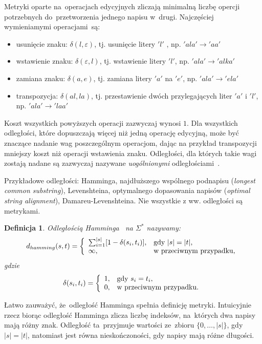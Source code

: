 \documentclass[12pt, twoside, openany]{report}
\theoremstyle{plain}
\newtheorem{defi}{Definicja}[section]
\begin{document}
Metryki oparte na~operacjach edycyjnych zliczają minimalną liczbę opercji potrzebnych do~przetworzenia jednego napisu w~drugi. Najczęściej wymieniamymi operacjami~są:
\begin{itemize}
\item usunięcie znaku: $\delta(l, \varepsilon)$, tj. usunięcie litery $'l'$ , np. $'ala' \rightarrow 'aa'$
\item wstawienie znaku: $\delta(\varepsilon, l)$, tj. wstawienie litery $'l'$, np. $'ala' \rightarrow 'alka'$
\item zamiana znaku: $\delta(a, e)$, tj. zamiana litery $'a'$ na $'e'$, np. $'ala' \rightarrow 'ela'$
\item transpozycja: $\delta(al, la)$, tj. przestawienie dwóch przylegających liter $'a'$ i $'l'$, np. $'ala' \rightarrow 'laa'$
\end{itemize}
Koszt wszystkich powyższych operacji zazwyczaj wynosi $1$. Dla wszystkich odległości, które dopuszczają więcej niż jedną operację edycyjną, może być znaczące nadanie wag poszczególnym operacjom, dając na przykład transpozycji mniejszy koszt niż operacji wstawienia znaku. Odległości, dla których takie wagi zostają nadane są zazwyczaj nazywane \emph{uogólnionymi} odległościami~\cite{Boytsov2011:indexingmethods}.

Przykładowe odległości: Hamminga, najdłuższego wspólnego podnapisu (\emph{longest common substring}), Levenshteina, optymalnego dopasowania napisów (\emph{optimal string alignment}), Damareu-Levenshteina. Nie wszystkie z ww. odległości są metrykami.

\begin{defi}
\emph{Odległością Hamminga}~\cite{Hamming1950:errordetecting} na $\Sigma^*$ nazywamy:
$$
d_{hamming}(s, t) = \left\{
\begin{array}{l l}     
    \sum_{i=1}^{|s|}[1 - \delta(s_i, t_i)], & \text{gdy } |s| = |t|,\\
    \infty, & \text{w przeciwnym przypadku},
\end{array}\right.
$$
gdzie 
$$
\delta(s_i, t_i) = \left\{
\begin{array}{l l}     
    1, & \text{gdy } s_i = t_i,\\
    0, & \text{w przeciwnym przypadku}.
\end{array}\right.
$$
\end{defi}

Łatwo zauważyć, że~odległość Hamminga spełnia definicję metryki. Intuicyjnie rzecz biorąc odległość Hamminga zlicza liczbę indeksów, na~których dwa napisy mają różny znak. Odległość ta~przyjmuje wartości ze~zbioru $\{0,\ldots,|s|\}$, gdy $|s|=|t|$, natomiast jest równa nieskończoności, gdy napisy mają różne długości.
\end{document}
